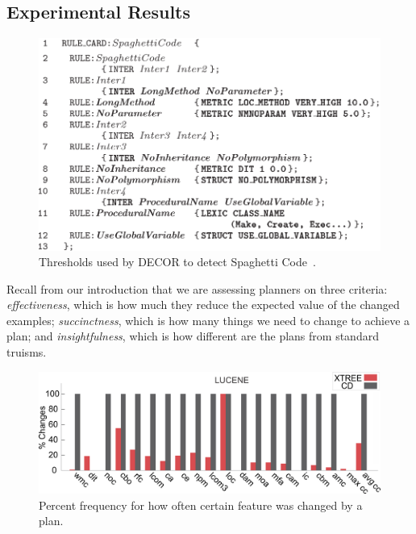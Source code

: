 \documentclass{sig-alternate}
\begin{document}
{\begin{itemize}[leftmargin=3mm]


\subsection{Experimental Results}

\begin{figure}[tb!]
\centering
\includegraphics[width=\linewidth]{figs/thresh.png}
\caption{Thresholds used by DECOR to detect Spaghetti Code~\cite{moha10}.}\label{fig:thresh}
\end{figure}

 
Recall from our introduction that we are assessing planners on three criteria:
{\em effectiveness}, which is how much they reduce the expected value of the changed examples;
{\em succinctness}, which is how many things we need to change to achieve a plan;
and {\em insightfulness}, which is how different are the plans from standard truisms.

\begin{figure}[tbp!]
\centering
\includegraphics[width=\linewidth]{figs/PercentChanges.png}
\caption{Percent frequency for how often certain feature was changed by a plan.}\label{fig:changed}
\end{figure}



\end{itemize}}
\end{document}

